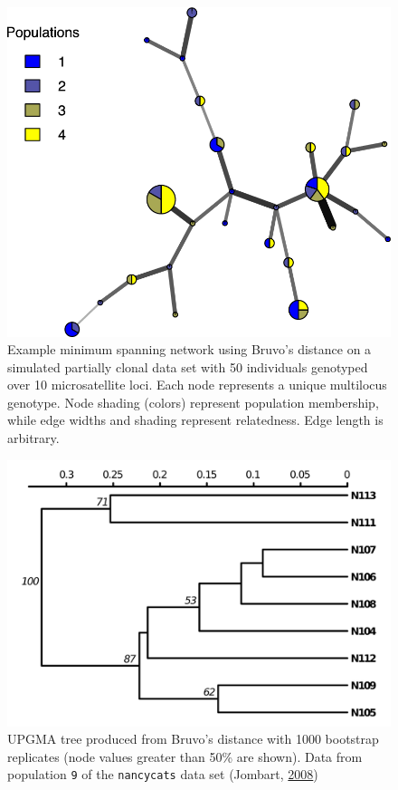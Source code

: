 \documentclass[double,12pt]{beavtex}
\begin{document}
  \begin{figure}
  
  {\centering \includegraphics[width=0.8\linewidth]{figure/poppr/bruvo_color} 
  
  }
  
  \caption[Example minimum spanning network using Bruvo's distance on a simulated
  partially clonal data set with 50 individuals genotyped over 10 microsatellite
  loci.]{Example minimum spanning network using Bruvo's distance on a simulated
  partially clonal data set with 50 individuals genotyped over 10 microsatellite
  loci. Each node represents a unique multilocus genotype. Node shading (colors)
  represent population membership, while edge widths and shading represent
  relatedness. Edge length is arbitrary.}\label{fig:poppr3}
  \end{figure}
  
  \newpage
  
  \begin{figure}
  
  {\centering \includegraphics[width=0.8\linewidth]{figure/poppr/nancy9-boot-redo} 
  
  }
  
  \caption[UPGMA tree produced from Bruvo's distance with 1000 bootstrap
  replicates.]{UPGMA tree produced from Bruvo's distance with 1000 bootstrap replicates
  (node values greater than 50\% are shown). Data from population
  \texttt{9} of the \texttt{nancycats} data set (Jombart,
  \protect\hyperlink{ref-Jombart:2008}{2008})}\label{fig:poppr4}
  \end{figure}
  
\end{document}
